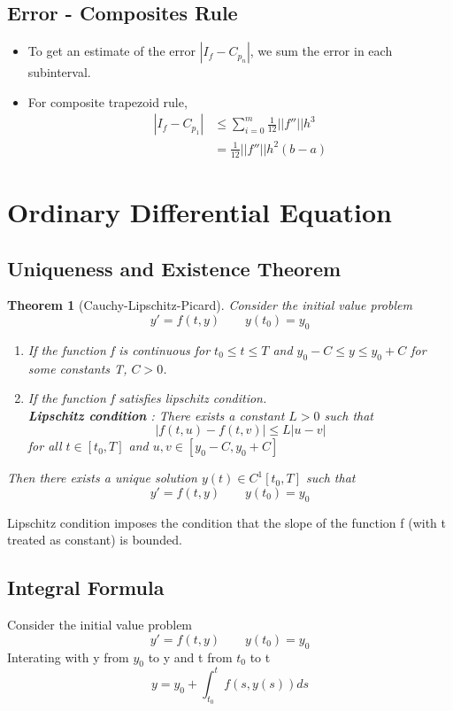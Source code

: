 \documentclass{article}
\newtheorem*{theorem}{Theorem}
\begin{document}
	\subsection{Error - Composites Rule}
	\begin{itemize}
	\item To get an estimate of the error $|I_f - C_{p_n}|$, we sum the error in each subinterval. 
	\item For composite trapezoid rule, 
	\begin{align*}
		|I_f - C_{p_1}| &\leq \sum_{i=0}^m \frac{1}{12}||f''||h^3\\
						&= \frac{1}{12} ||f''|| h^2 (b-a)
	\end{align*}
	\end{itemize}


\section{Ordinary Differential Equation}
	\subsection{Uniqueness and Existence Theorem}
	\begin{theorem}[Cauchy-Lipschitz-Picard]
		Consider the initial value problem 
		\[y' = f(t,y) \qquad y(t_0) = y_0 \]
		\begin{enumerate}
			\item If the function f is continuous for $t_0\leq t \leq T$ and $y_0 -C \leq y \leq y_0 +C$ for some constants T, $C>0$.
			\item If the function f satisfies lipschitz condition. \\
			\textbf{Lipschitz condition }: There exists a constant $L>0$ such that 
			\[|f(t,u)-f(t,v)|\leq L|u-v| \]
			for all $t\in [t_0, T]$ and $u,v \in [y_0 - C, y_0 + C]$
		\end{enumerate}
		Then there exists a unique solution $y(t) \in C^1[t_0,T]$ such that 
		\[y' = f(t,y) \qquad y(t_0) = y_0\]
	\end{theorem}
	Lipschitz condition imposes the condition that the slope of the function f (with t treated as constant) is bounded. 


	\subsection{Integral Formula}
		Consider the initial value problem
		\[y' = f(t,y) \qquad y(t_0) = y_0 \]
		Interating with y from $y_0$ to y and t from $t_0$ to t
		\[y = y_0 + \int_{t_0}^t f(s,y(s))ds \]
\end{document}
